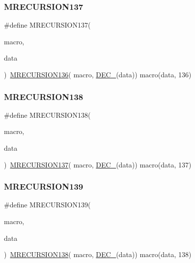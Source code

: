 \subsubsection{\texorpdfstring{MRECURSION137}{MRECURSION137}}
{\footnotesize\ttfamily \#define M\+R\+E\+C\+U\+R\+S\+I\+O\+N137(\begin{DoxyParamCaption}\item[{}]{macro,  }\item[{}]{data }\end{DoxyParamCaption})~\mbox{\hyperlink{group__group__sam0__utils__mrecursion_ga14dc3ff957489f36ff0edd97c663379b}{M\+R\+E\+C\+U\+R\+S\+I\+O\+N136}}(  macro, \mbox{\hyperlink{group__group__sam0__utils__mrecursion_ga1d23d683797679dca8c3512a54a5dcae}{D\+E\+C\+\_\+}}(data))   macro(data, 136)}

\mbox{\label{group__group__sam0__utils__mrecursion_ga77d047e7ca2ab8a69562bd7cd7f62186}} 
\subsubsection{\texorpdfstring{MRECURSION138}{MRECURSION138}}
{\footnotesize\ttfamily \#define M\+R\+E\+C\+U\+R\+S\+I\+O\+N138(\begin{DoxyParamCaption}\item[{}]{macro,  }\item[{}]{data }\end{DoxyParamCaption})~\mbox{\hyperlink{group__group__sam0__utils__mrecursion_gab821ae0bbb999d5fd6e068b577603f95}{M\+R\+E\+C\+U\+R\+S\+I\+O\+N137}}(  macro, \mbox{\hyperlink{group__group__sam0__utils__mrecursion_ga1d23d683797679dca8c3512a54a5dcae}{D\+E\+C\+\_\+}}(data))   macro(data, 137)}

\mbox{\label{group__group__sam0__utils__mrecursion_ga1de6fa2750176e2d386c0e8e6d937476}} 
\subsubsection{\texorpdfstring{MRECURSION139}{MRECURSION139}}
{\footnotesize\ttfamily \#define M\+R\+E\+C\+U\+R\+S\+I\+O\+N139(\begin{DoxyParamCaption}\item[{}]{macro,  }\item[{}]{data }\end{DoxyParamCaption})~\mbox{\hyperlink{group__group__sam0__utils__mrecursion_ga77d047e7ca2ab8a69562bd7cd7f62186}{M\+R\+E\+C\+U\+R\+S\+I\+O\+N138}}(  macro, \mbox{\hyperlink{group__group__sam0__utils__mrecursion_ga1d23d683797679dca8c3512a54a5dcae}{D\+E\+C\+\_\+}}(data))   macro(data, 138)}

